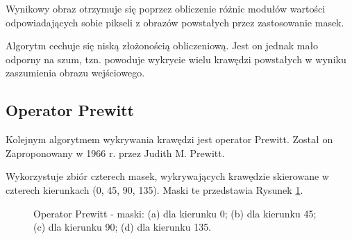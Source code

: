 \documentclass[a4paper,twocolumn,12pt]{article}
\begin{document}
Wynikowy obraz otrzymuje się poprzez obliczenie różnic modułów wartości odpowiadających sobie pikseli z obrazów powstałych przez zastosowanie masek.

Algorytm cechuje się niską złożonością obliczeniową.
Jest on jednak mało odporny na szum, tzn. powoduje wykrycie wielu krawędzi powstałych w wyniku zaszumienia obrazu wejściowego.


\subsection{Operator Prewitt}

Kolejnym algorytmem wykrywania krawędzi jest operator Prewitt.
Został on Zaproponowany w 1966 r. przez Judith M. Prewitt.

Wykorzystuje zbiór czterech masek, wykrywających krawędzie skierowane w czterech kierunkach (0\textdegree, 45\textdegree, 90\textdegree, 135\textdegree).
Maski te przedstawia Rysunek \ref{fig:prewitt_matrices}.

\begin{figure}[!ht]
 \begin{center}
 \end{center}
 \caption{
  Operator Prewitt - maski:
  (a) dla kierunku 0\textdegree;
  (b) dla kierunku 45\textdegree;
  (c) dla kierunku 90\textdegree;
  (d) dla kierunku 135\textdegree.
 }
 \label{fig:prewitt_matrices}
\end{figure}
\end{document}
